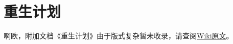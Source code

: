 \renewcommand{\DOCNAME}{重生计划}
\renewcommand{\DOCSLUG}{resurrection}

\chapter[\DOCNAME]{
    \DOCNAME
}

\label{chap:COMP-\DOCSLUG}

啊欧，附加文档《\DOCNAME 》由于版式复杂暂未收录，请查阅\href{http://scp-wiki-cn.wikidot.com/\DOCSLUG}{Wiki原文}。
